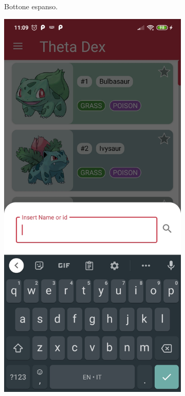 \documentclass[a4paper,11pt]{article}
\begin{document}
\begin{figure}[h!]
{\begin{subfigure}[b]{0.3\linewidth}
    \caption{Bottone espanso.}
  \end{subfigure}
  \begin{subfigure}[b]{0.3\linewidth}
    \includegraphics[width=\linewidth]{search.jpg}

\end{subfigure}}
\end{figure}
\end{document}
